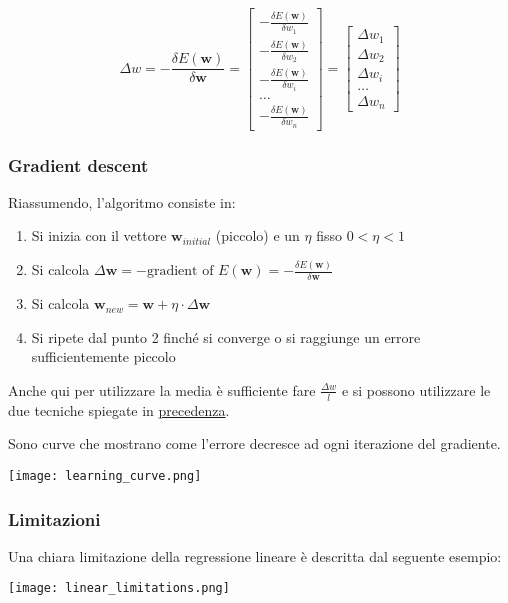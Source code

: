 \begin{equation}
	\Delta w = - \frac{\delta E(\mathbf{w})}{\delta \mathbf{w}} = \begin{bmatrix}
		- \frac{\delta E(\mathbf{w})}{\delta w_1} \\
		- \frac{\delta E(\mathbf{w})}{\delta w_2} \\
		- \frac{\delta E(\mathbf{w})}{\delta w_i} \\
		\ldots \\
		- \frac{\delta E(\mathbf{w})}{\delta w_n}
	\end{bmatrix} = 
	\begin{bmatrix}
		\Delta w_1 \\
		\Delta w_2 \\
		\Delta w_i \\
		\ldots \\
		\Delta w_n
	\end{bmatrix}
\end{equation}
\subsubsection{Gradient descent}
Riassumendo, l'algoritmo consiste in:
\begin{enumerate}
	\item Si inizia con il vettore $\mathbf{w}_{initial}$ (piccolo) e un $\eta$ fisso $0 < \eta < 1$
	\item Si calcola $\Delta \mathbf{w} = - \text{gradient of } E(\mathbf{w}) = -\frac{\delta E(\mathbf{w})}{\delta \mathbf{w}}$
	\item Si calcola $\mathbf{w}_{new}=\mathbf{w} + \eta \cdot \Delta\mathbf{w}$
	\item Si ripete dal punto 2 finché si converge o si raggiunge un errore sufficientemente piccolo
\end{enumerate}
Anche qui per utilizzare la media è sufficiente fare $\frac{\Delta w}{l}$ e si possono utilizzare le due tecniche spiegate in \hyperref[def:batch_online]{precedenza}.

\begin{definition}
	Sono curve che mostrano come l'errore decresce ad ogni iterazione del gradiente.
	\begin{center}
		\texttt{[image: learning\_curve.png]}
	\end{center}
\end{definition}
\subsubsection{Limitazioni}
Una chiara limitazione della regressione lineare è descritta dal seguente esempio:
\begin{center}
	\texttt{[image: linear\_limitations.png]}
\end{center}
